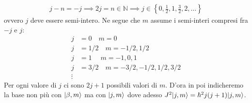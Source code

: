 \begin{align*}
  j - n = -j \implies 2j = n \in \mathbb{N} \implies j \in \left\{0,\frac12, 1, \frac32, 2, \dots\right\}
\end{align*}
ovvero $ j $ deve essere semi-intero. Ne segue che $ m $ assume i semi-interi compresi fra $ -j $ e $ j $:
\begin{align*}
  j &= 0\quad m = 0
  \\
  j &= 1/2 \quad m = -1/2,1/2
  \\
  j &= 1\quad \;m = -1, 0, 1
  \\
  j &= 3/2 \quad m = -3/2, -1/2, 1/2, 3/2
  \\
  \vdots
\end{align*}
Per ogni valore di $ j $ ci sono $ 2j + 1 $ possibili valori di $ m $. D'ora in poi indicheremo la base non più con $ \vert \beta, m \rangle $ ma con $ \vert j,m \rangle $ 
dove adesso $ J^2\vert j, m \rangle = \hbar^2 j(j+1) \vert j, m \rangle $.


